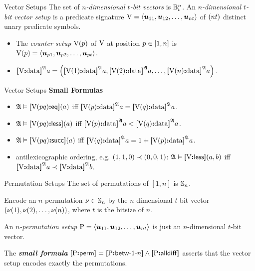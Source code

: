 \documentclass{beamer}
\begin{document}
\begin{frame}{Vector Setups}
The set of \emph{$n$-dimensional $t$-bit vectors} is $\ntBitnums\nn\tbit$.
An \emph{$n$-dimensional $t$-bit vector setup} is a predicate signature  $\VS =
\seq{\suu{11}, \suu{12}, \dots, \suu{\nn\tbit}}$ of $(\nn\tbit)$ distinct unary
predicate symbols.
\begin{itemize}
  \item
  The \emph{counter setup $\VSp\posp$} of $\VS$ at position $\posp \in [1,\nn]$
  is $\VSp\posp = \seq{\suu{\posp1},\suu{\posp2},\dots,\suu{\posp\tbit}}$.
  
  \item
  $\data\VS\StrA\ea = \left(\data{\VSp1}\StrA\ea,\data{\VSp2}\StrA\ea, \dots,
  \data{\VSp\nn}\StrA\ea\right)$.
\end{itemize}
\end{frame}

\begin{frame}{Vector Setups \textbf{Small Formulas}}
\begin{itemize}
  \item
  $\StrA\vDash\feqP\VS\posp\posq(\ea)$ iff $\data{\VSp\posp}\StrA\ea =
  \data{\VSp\posq}\StrA\ea$.
  
  \item
  $\StrA\vDash\flessP\VS\posp\posq(\ea)$ iff $\data{\VSp\posp}\StrA\ea <
  \data{\VSp\posq}\StrA\ea$.
  
  \item
  $\StrA\vDash\fsuccP\VS\posp\posq(\ea)$ iff $\data{\VSp\posq}\StrA\ea =
  1 + \data{\VSp\posp}\StrA\ea$.
  
  \item
  antilexicographic ordering, e.g. $(1,1,0)\lexlt (0,0,1)$:
  $\StrA\vDash\fless\VS(\ea,\eb)$ iff
  $\data{\VS}\StrA\ea\lexlt\data{\VS}\StrA\eb$.
\end{itemize}
\end{frame}

\begin{frame}{Permutation Setups}
The set of permutations of $[1,n]$ is $\Perms\nn$.

Encode an $n$-permutation $\permnu\in\Perms\nn$ by the
$n$-dimensional $t$-bit vector $(\permnu(1), \permnu(2), \dots, \permnu(n))$,
where $t$ is the bitsize of $n$.

An \emph{$n$-permutation setup} $\PS =
\seq{\suu{11},\suu{12},\dots,\suu{nt}}$ is just an $n$-dimensional $t$-bit
vector.

The \emph{\textbf{small formula}} $\fperm\PS = \fbetw\PS1\nn \land \falldiff\PS$
asserts that the vector setup encodes exactly the permutations.
\end{frame}
\end{document}

